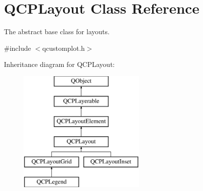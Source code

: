 \hypertarget{class_q_c_p_layout}{}\section{Q\+C\+P\+Layout Class Reference}
\label{class_q_c_p_layout}


The abstract base class for layouts.  




{\ttfamily \#include $<$qcustomplot.\+h$>$}

Inheritance diagram for Q\+C\+P\+Layout\+:\begin{figure}[H]
\begin{center}
\leavevmode
\includegraphics[height=6.000000cm]{class_q_c_p_layout}
\end{center}
\end{figure}
